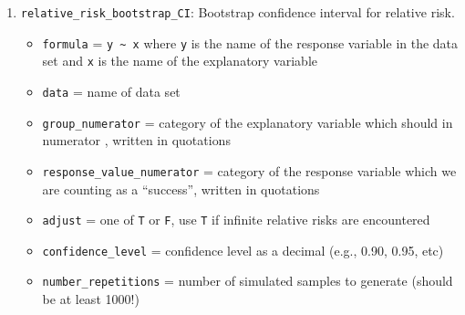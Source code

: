 \documentclass[
  10pt,
  openany]{book}
\providecommand{\tightlist}{%
  \setlength{\itemsep}{0pt}\setlength{\parskip}{0pt}}
\theoremstyle{definition}
\theoremstyle{definition}
\theoremstyle{definition}
\theoremstyle{definition}
\theoremstyle{remark}
\begin{document}
\begin{enumerate}
  \begin{itemize}
  \tightlist
  \item
    \texttt{formula} = \texttt{y\ \textasciitilde{}\ x} where \texttt{y} is the name of the response variable in the data set and \texttt{x} is the name of the explanatory variable
  \item
    \texttt{data} = name of data set
  \item
    \texttt{group\_numerator} = category of the explanatory variable which should in numerator , written in quotations
  \item
    \texttt{response\_value\_numerator} = category of the response variable which we are counting as a ``success'', written in quotations
  \item
    \texttt{direction} = one of \texttt{"greater"}, \texttt{"less"}, or \texttt{"two-sided"} (quotations are important here!) to match the sign in \(H_A\)
  \item
    \texttt{as\_extreme\_as} = value of observed relative risk
  \item
    \texttt{adjust} = one of \texttt{T} or \texttt{F}, use \texttt{T} if infinite relative risks are encountered
  \item
    \texttt{number\_repetitions} = number of simulated samples to generate (should be at least 1000!)
  \end{itemize}
\item
  \texttt{relative\_risk\_bootstrap\_CI}: Bootstrap confidence interval for relative risk.

  \begin{itemize}
  \tightlist
  \item
    \texttt{formula} = \texttt{y\ \textasciitilde{}\ x} where \texttt{y} is the name of the response variable in the data set and \texttt{x} is the name of the explanatory variable
  \item
    \texttt{data} = name of data set
  \item
    \texttt{group\_numerator} = category of the explanatory variable which should in numerator , written in quotations
  \item
    \texttt{response\_value\_numerator} = category of the response variable which we are counting as a ``success'', written in quotations
  \item
    \texttt{adjust} = one of \texttt{T} or \texttt{F}, use \texttt{T} if infinite relative risks are encountered
  \item
    \texttt{confidence\_level} = confidence level as a decimal (e.g., 0.90, 0.95, etc)
  \item
    \texttt{number\_repetitions} = number of simulated samples to generate (should be at least 1000!)
  \end{itemize}
\end{enumerate}
\end{document}
